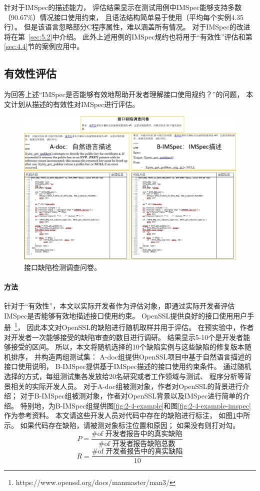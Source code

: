 针对于IMSpec的描述能力，
评估结果显示在测试用例中IMSpec能够支持多数（90.67\%）情况接口使用约束，
且语法结构简单易于使用（平均每个实例4.35行）。
但是该语言忽略部分C程序属性，难以涵盖所有情况。
对于IMSpec的改进将在第~\ref{sec:5.2}中介绍。
此外上述用例的IMSpec规约也将用于“有效性”评估和第\ref{sec:4.4}节的案例应用中。


\subsection{有效性评估}
为回答上述“IMSpec是否能够有效地帮助开发者理解接口使用规约？”的问题，
本文计划从描述的有效性对IMSpec进行评估。

\begin{figure}[b]
	\centering
	\includegraphics[width=0.85\linewidth]{figures/cp2-survey.png}
	\caption{
		接口缺陷检测调查问卷。
	}
	\label{fig:2-5-survey}
\end{figure}

\paragraph{方法}
针对于“有效性”，本文以实际开发者作为评估对象，即通过实际开发者评估IMSpec是否能够有效地描述接口使用约束。
OpenSSL提供良好的接口使用用户手册~\footnote{https://www.openssl.org/docs/manmaster/man3/}，
因此本文对OpenSSL的缺陷进行随机取样并用于评估。
在预实验中，作者对开发者一次能够接受的缺陷审查的数目进行调研。
结果显示5-10个是开发者能够接受的区间。
所以，本文将随机选择的10个缺陷实例与这些缺陷的修复版本随机排序，
并构造两组测试集：
A-doc组提供OpenSSL项目中基于自然语言描述的接口使用说明，
B-IMSpec提供基于IMSpec描述的接口使用约束条件。
通过随机选择的方式，每组测试集各发放给20名研究或者工作领域与测试、
程序分析等背景相关的实际开发人员。
对于A-doc组被测对象，作者对OpenSSL的背景进行介绍；
对于B-IMSpec组被测对象，作者对OpenSSL背景以及IMSpec进行简单的介绍。
特别地，为B-IMSpec组提供图\ref{fig:2-4-example}和图\ref{fig:2-4-example-imspec}作为参考资料。
本文请这些开发人员对代码中存在的缺陷进行标注，
如图\ref{fig:2-5-survey}中所示。
如果代码存在缺陷，请被测对象标注位置和原因；
如果没有则打对勾。
\begin{equation}
\label{eq:p}
P = \dfrac{\text{\# of 开发者报告中的真实缺陷}}{\text{\# of 开发者报告缺陷总数}}
\end{equation}
\begin{equation}
\label{eq:r}
R = \dfrac{\text{\# of 开发者报告中的真实缺陷}}{10}
\end{equation}


